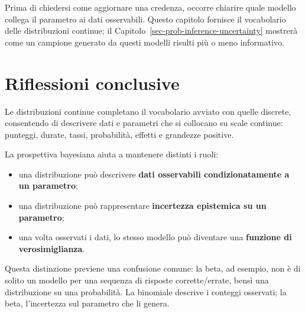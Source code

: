 \documentclass[
  italian,
  letterpaper,
  a4paper,
  11pt,
  open=any]{scrbook}
\providecommand{\tightlist}{%
  \setlength{\itemsep}{0pt}\setlength{\parskip}{0pt}}
\theoremstyle{plain}
\theoremstyle{definition}
\theoremstyle{definition}
\theoremstyle{remark}
\begin{document}
\begin{tcolorbox}[enhanced jigsaw, arc=.35mm, bottomrule=.15mm, bottomtitle=1mm, breakable, colback=white, colbacktitle=quarto-callout-important-color!10!white, colframe=quarto-callout-important-color-frame, coltitle=black, left=2mm, leftrule=.75mm, opacityback=0, opacitybacktitle=0.6, rightrule=.15mm, title=\textcolor{quarto-callout-important-color}{\faExclamation}\hspace{0.5em}{Modello generativo prima dell'inferenza}, titlerule=0mm, toprule=.15mm, toptitle=1mm]

Prima di chiedersi come aggiornare una credenza, occorre chiarire quale
modello collega il parametro ai dati osservabili. Questo capitolo
fornisce il vocabolario delle distribuzioni continue; il
Capitolo~\ref{sec-prob-inference-uncertainty} mostrerà come un campione
generato da questi modelli risulti più o meno informativo.

\end{tcolorbox}

\section*{Riflessioni conclusive}\label{riflessioni-conclusive-11}


Le distribuzioni continue completano il vocabolario avviato con quelle
discrete, consentendo di descrivere dati e parametri che si collocano su
scale continue: punteggi, durate, tassi, probabilità, effetti e
grandezze positive.

La prospettiva bayesiana aiuta a mantenere distinti i ruoli:

\begin{itemize}
\tightlist
\item
  una distribuzione può descrivere \textbf{dati osservabili
  condizionatamente a un parametro};
\item
  una distribuzione può rappresentare \textbf{incertezza epistemica su
  un parametro};
\item
  una volta osservati i dati, lo stesso modello può diventare una
  \textbf{funzione di verosimiglianza}.
\end{itemize}

Questa distinzione previene una confusione comune: la beta, ad esempio,
non è di solito un modello per una sequenza di risposte corrette/errate,
bensì una distribuzione su una probabilità. La binomiale descrive i
conteggi osservati; la beta, l'incertezza sul parametro che li genera.
\end{document}
